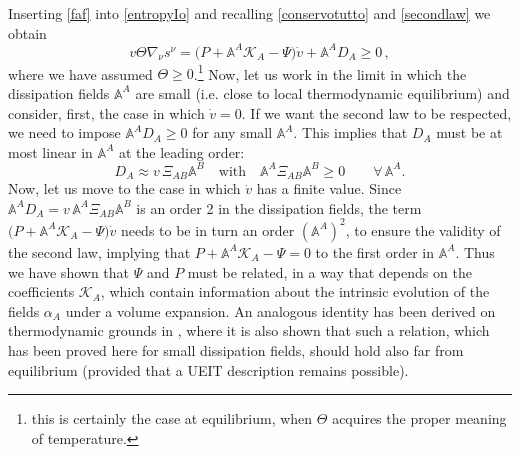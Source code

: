 \documentclass[a4paper, amsfonts, amssymb, amsmath, reprint, twocolumn, showkeys, nofootinbib]{revtex4-2}
\begin{document}
Inserting \eqref{faf} into \eqref{entropyIo} and recalling \eqref{conservotutto} and \eqref{secondlaw} we obtain
\begin{equation}\label{intermadioAAAA}
v\Theta \nabla_\nu s^\nu= 
\big(P+\mathbb{A}^A \mathcal{K}_A -\Psi \big)\dot{v} + \mathbb{A}^A D_A \geq 0 \, ,
\end{equation}
where we have assumed $\Theta \geq  0$.\footnote{this is certainly the case at equilibrium, when $\Theta$ acquires the proper meaning of temperature.}
Now, let us work in the limit in which the dissipation fields $\mathbb{A}^A$ are small (i.e. close to local thermodynamic equilibrium) and consider, first, the case in which $\dot{v}=0$. If we want the second law to be respected, we need to impose $\mathbb{A}^A D_A \geq 0$ for any small $\mathbb{A}^A$. This implies that $D_A$ must be at most linear in $\mathbb{A}^A$ at the leading order: 
\begin{equation}
D_A \approx v \, \Xi_{AB}\mathbb{A}^B  \quad   \text{with} \quad   \mathbb{A}^A \Xi_{AB} \mathbb{A}^B \geq 0 \qquad   \forall \, \mathbb{A}^A  .  
\end{equation}
Now, let us move to the case in which $\dot{v}$ has a finite value. Since $\mathbb{A}^A D_A=v \,\mathbb{A}^A \Xi_{AB} \mathbb{A}^B$ is an order 2 in the dissipation fields, the term $\big(P+\mathbb{A}^A \mathcal{K}_A -\Psi \big)\dot{v}$ needs to be in turn an order $(\mathbb{A}^A)^2$, to ensure the validity of the second law, implying that $P+\mathbb{A}^A \mathcal{K}_A -\Psi =0$ to the first order in $\mathbb{A}^A$. Thus we have shown that $\Psi$ and $P$ must be related, in a way that depends on the coefficients $\mathcal{K}_A$, which contain information about the intrinsic evolution of the fields $\alpha_A$ under a volume expansion. An analogous identity has been derived on thermodynamic grounds in \cite{BulkGavassino}, where it is also shown that such a relation, which has been proved here for small dissipation fields, should hold also far from equilibrium (provided that a UEIT description remains possible). 
\end{document}
